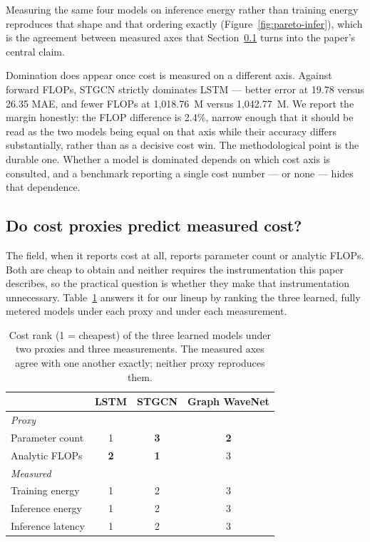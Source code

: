 \documentclass[manuscript,screen,review]{acmart}
\begin{document}
Measuring the same four models on inference energy rather than training energy
reproduces that shape and that ordering exactly (Figure~\ref{fig:pareto-infer}),
which is the agreement between measured axes that Section~\ref{sec:proxy} turns
into the paper's central claim.

Domination does appear once cost is measured on a different axis. Against
forward FLOPs, STGCN strictly dominates LSTM --- better error at 19.78 versus
26.35 MAE, and fewer FLOPs at 1{,}018.76~M versus 1{,}042.77~M. We report the
margin honestly: the FLOP difference is 2.4\%, narrow enough that it should be
read as the two models being equal on that axis while their accuracy differs
substantially, rather than as a decisive cost win. The methodological point is
the durable one. Whether a model is dominated depends on which cost axis is
consulted, and a benchmark reporting a single cost number --- or none --- hides
that dependence.

\subsection{Do cost proxies predict measured cost?}
\label{sec:proxy}
The field, when it reports cost at all, reports parameter count or analytic
FLOPs. Both are cheap to obtain and neither requires the instrumentation this
paper describes, so the practical question is whether they make that
instrumentation unnecessary. Table~\ref{tab:proxy} answers it for our lineup
by ranking the three learned, fully metered models under each proxy and under
each measurement.

\begin{table}[t]
\centering
\caption{Cost rank (1 = cheapest) of the three learned models under two
proxies and three measurements. The measured axes agree with one another
exactly; neither proxy reproduces them.}
\label{tab:proxy}
\begin{tabular}{lccc}
\toprule
 & LSTM & STGCN & Graph WaveNet \\
\midrule
\multicolumn{4}{l}{\emph{Proxy}} \\
Parameter count      & 1 & \textbf{3} & \textbf{2} \\
Analytic FLOPs       & \textbf{2} & \textbf{1} & 3 \\
\midrule
\multicolumn{4}{l}{\emph{Measured}} \\
Training energy      & 1 & 2 & 3 \\
Inference energy     & 1 & 2 & 3 \\
Inference latency    & 1 & 2 & 3 \\
\bottomrule
\end{tabular}
\end{table}
\end{document}
